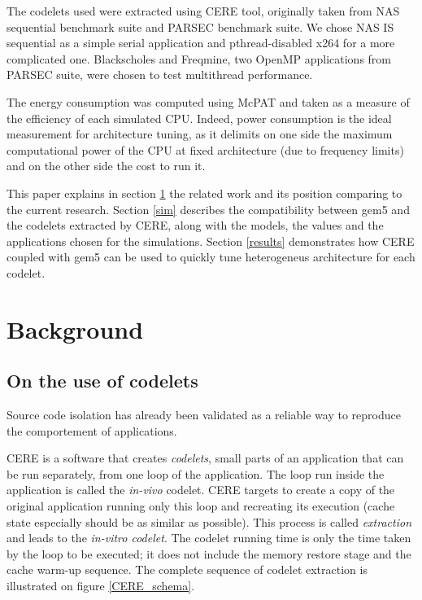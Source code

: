 \documentclass{article}
\begin{document}
\begin{multicols}{2}
The codelets used were extracted using CERE\cite{CERE} tool, originally taken from NAS\cite{NAS} sequential benchmark suite and PARSEC\cite{PARSEC} benchmark suite. We chose NAS IS sequential as a simple serial application and pthread-disabled x264 for a more complicated one. Blackscholes and Freqmine, two OpenMP applications from PARSEC suite, were chosen to test multithread performance.


The energy consumption was computed using McPAT\cite{McPAT} and taken as a measure of the efficiency of each simulated CPU. Indeed, power consumption is the ideal measurement for architecture tuning, as it delimits on one side the maximum computational power of the CPU at fixed architecture (due to frequency limits) and on the other side the cost to run it.

This paper explains in section \ref{bckgrnd} the related work and its position comparing to the current research. Section \ref{sim} describes the compatibility between gem5 and the codelets extracted by CERE, along with the models, the values and the applications chosen for the simulations. Section \ref{results} demonstrates how CERE coupled with gem5 can be used to quickly tune heterogeneus architecture for each codelet.


\section{Background}
\label{bckgrnd}






\subsection{On the use of codelets}
Source code isolation has already been validated as a reliable way to reproduce the comportement of applications. 

CERE is a software that creates \textit{codelets}, small parts of an application that can be run separately, from one loop of the application.
The loop run inside the application is called the \textit{in-vivo} codelet. CERE targets to create a copy of the original application running only this loop and recreating its execution (cache state especially should be as similar as possible). This process is called \textit{extraction} and leads to the \textit{in-vitro codelet}. The codelet running time is only the time taken by the loop to be executed; it does not include the memory restore stage and the cache warm-up sequence. The complete sequence of codelet extraction is illustrated on figure \ref{CERE_schema}.



\end{multicols}
\end{document}
